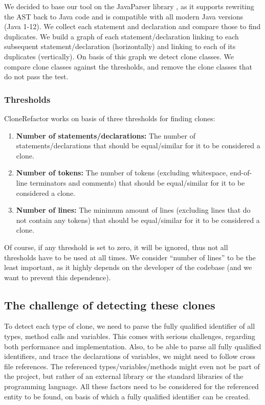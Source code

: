 \documentclass[a4paper]{article}
\begin{document}
We decided to base our tool on the JavaParser library \cite{tomassetti2017javaparser}, as it supports rewriting the AST back to Java code and is compatible with all modern Java versions (Java 1-12). We collect each statement and declaration and compare those to find duplicates. We build a graph of each statement/declaration linking to each subsequent statement/declaration (horizontally) and linking to each of its duplicates (vertically). On basis of this graph we detect clone classes. We compare clone classes against the thresholds, and remove the clone classes that do not pass the test.

\subsubsection{Thresholds}\label{chap:thresholds}
CloneRefactor works on basis of three thresholds for finding clones:
\begin{enumerate}
  \item \textbf{Number of statements/declarations:} The number of statements/declarations that should be equal/similar for it to be considered a clone.
  \item \textbf{Number of tokens:} The number of tokens (excluding whitespace, end-of-line terminators and comments) that should be equal/similar for it to be considered a clone.
  \item \textbf{Number of lines:} The minimum amount of lines (excluding lines that do not contain any tokens) that should be equal/similar for it to be considered a clone.
\end{enumerate}
Of course, if any threshold is set to zero, it will be ignored, thus not all thresholds have to be used at all times. We consider ``number of lines'' to be the least important, as it highly depends on the developer of the codebase (and we want to prevent this dependence).

\subsection{The challenge of detecting these clones}\label{chap:challenge}
To detect each type of clone, we need to parse the fully qualified identifier of all types, method calls and variables. This comes with serious challenges, regarding both performance and implementation. Also, to be able to parse all fully qualified identifiers, and trace the declarations of variables, we might need to follow cross file references. The referenced types/variables/methods might even not be part of the project, but rather of an external library or the standard libraries of the programming language. All these factors need to be considered for the referenced entity to be found, on basis of which a fully qualified identifier can be created.
\end{document}
